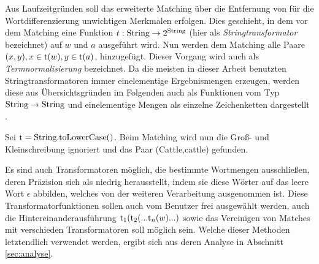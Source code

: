 Aus Laufzeitgründen soll das erweiterte Matching über die Entfernung von für die Wortdifferenzierung unwichtigen Merkmalen erfolgen.
Dies geschieht, in dem vor dem Matching eine Funktion $t: \textnormal{String} \rightarrow 2^\textnormal{String}$ (hier als \emph{Stringtransformator} bezeichnet) auf $w$ und $a$ ausgeführt wird.
Nun werden dem Matching alle Paare $(x,y), x \in \textnormal{t}(w), y \in \textnormal{t}(a)$, hinzugefügt. Dieser Vorgang wird auch als \emph{Termnormalisierung} bezeichnet.
Da die meisten in dieser Arbeit benutzten Stringtransformatoren immer einelementige Ergebnismengen erzeugen, werden diese aus Übersichtsgründen im Folgenden auch 
als Funktionen vom Typ $\textnormal{String} \rightarrow \textnormal{String}$ und einelementige Mengen als einzelne Zeichenketten dargestellt .

\begin{bsp}
Sei $\textnormal{t}=\textnormal{String.toLowerCase()}$. Beim Matching wird nun die Groß- und Kleinschreibung ignoriert und das Paar (Cattle,cattle) gefunden.
\end{bsp}

Es sind auch Transformatoren möglich, die bestimmte Wortmengen ausschließen, deren Präzision sich als niedrig herausstellt,
indem sie diese Wörter auf das leere Wort $\epsilon$ abbilden, welches von der weiteren Verarbeitung ausgenommen ist.
Diese Transformatorfunktionen sollen auch vom Benutzer frei ausgewählt werden, auch die Hintereinanderausführung $\textnormal{t}_1(\textnormal{t}_2(...\textnormal{t}_n(w)...)$ sowie das Vereinigen von Matches mit verschieden Transformatoren soll möglich sein. 
Welche dieser Methoden letztendlich verwendet werden, ergibt sich aus deren Analyse in Abschnitt \ref{sec:analyse}.

